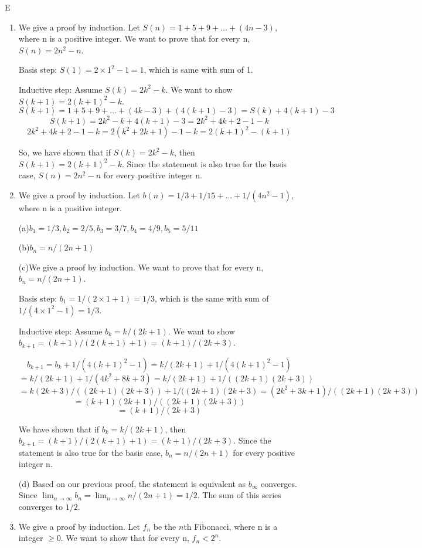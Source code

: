 E\documentclass[a4paper]{article}
\begin{document}
\begin{enumerate}

\item[2]
We give a proof by induction. 
Let $S(n)=1+5+9+...+(4n-3)$, where n is a positive integer.
We want to prove that for every n, $S(n)=2n^2-n$.


Basis step:
$S(1)=2 \times 1^2-1=1$, which is same with sum of 1. 


Inductive step:
Assume $S(k)=2k^2-k$. We want to show $S(k+1)=2(k+1)^2-k$. 
$$S(k+1)=1+5+9+...+(4k-3)+(4(k+1)-3)=S(k)+4(k+1)-3$$
$$S(k+1)=2k^2-k+4(k+1)-3=2k^2+4k+2-1-k$$
$$2k^2+4k+2-1-k=2(k^2+2k+1)-1-k=2(k+1)^2-(k+1)$$


So, we have shown that if $S(k)=2k^2-k$, then $S(k+1)=2(k+1)^2-k$. Since the statement is also true for the basis case, $S(n)=2n^2-n$ for every positive integer n.




\item [12]
We give a proof by induction. 
Let $b(n)=1/3+1/15+...+1/(4n^2-1)$, where n is a positive integer.


(a)$b_{1}=1/3,b_{2}=2/5,b_{3}=3/7,b_{4}=4/9, b_{5}=5/11$ 


(b)$b_{n}=n/(2n+1)$


(c)We give a proof by induction. 
We want to prove that for every n, $b_{n}=n/(2n+1)$.


Basis step:
$b_{1}=1/(2\times 1 +1)=1/3$, which is the same with sum of $1/(4\times 1^2-1)=1/3$. 

Inductive step:
Assume $b_{k}=k/(2k+1)$. We want to show $b_{k+1}=(k+1)/(2(k+1)+1)=(k+1)/(2k+3)$. 

$$b_{k+1}=b_{k}+1/(4(k+1)^2-1)=k/(2k+1)+1/(4(k+1)^2-1)$$
$$=k/(2k+1)+1/(4k^2+8k+3)=k/(2k+1)+1/((2k+1)(2k+3))$$
$$=k(2k+3)/((2k+1)(2k+3))+1/((2k+1)(2k+3)=(2k^2+3k+1)/((2k+1)(2k+3))$$
$$=(k+1)(2k+1)/((2k+1)(2k+3))$$
$$=(k+1)/(2k+3)$$



We have shown that if $b_{k}=k/(2k+1)$, then $b_{k+1}=(k+1)/(2(k+1)+1)=(k+1)/(2k+3)$. Since the statement is also true for the basis case, $b_{n}=n/(2n+1)$ for every positive integer n.

(d) Based on our previous proof, the statement is equivalent as $b_{\infty}$ converges. Since $\displaystyle \lim_{n \to \infty}b_{n}=\displaystyle \lim_{n \to \infty}n/(2n+1)=1/2$. The sum of this series converges to $1/2$.


\item[24]
We give a proof by induction. Let $f_{n}$ be the $n$th Fibonacci, where n is a integer $\geq 0$. We want to show that for every n, $f_{n}<2^n$. 



\end{enumerate}
\end{document}
